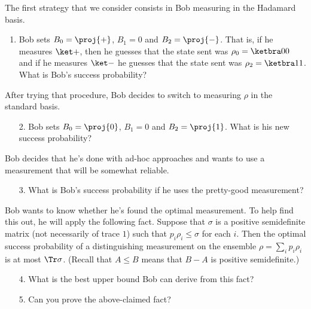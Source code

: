 \begin{exercises}
The first strategy that we consider consists in Bob measuring in the Hadamard basis. 
\begin{enumerate}
\item Bob sets $B_0 = \proj{+}$, $B_1=0$ and $B_2 = \proj{-}$. That is, if he measures $\ket +$, then he guesses that the state sent was $\rho_0 = \ketbra 00$ and if he measures $\ket -$ he guesses that the state sent was $\rho_2 = \ketbra 11$. What is Bob's success probability?
\end{enumerate}
After trying that procedure, Bob decides to switch to measuring $\rho$ in the standard basis.
\begin{enumerate}
\item[2.] Bob sets $B_0=\proj{0}$, $B_1=0$ and $B_2 = \proj{1}$. What is his new success probability?
\end{enumerate}
Bob decides that he's done with ad-hoc approaches and wants to use a measurement that will be somewhat reliable.
\begin{enumerate}
\item[3.] What is Bob's success probability if he uses the pretty-good measurement? 
\end{enumerate}
Bob wants to know whether he's found the optimal measurement. To help find this out, he will apply the following fact. Suppose that $\sigma$ is a positive semidefinite matrix (not necessarily of trace $1$) such that $p_i\rho_i \leq \sigma$ for each $i$. Then the optimal success probability of a distinguishing measurement on the ensemble $\rho = \sum_ip_i\rho_i$ is at most $\Tr\sigma$. (Recall that $A\leq B$ means that $B-A$ is positive semidefinite.)
\begin{enumerate}
\item[4.] What is the best upper bound Bob can derive from this fact?
\item[5.] Can you prove the above-claimed fact?
\end{enumerate}


\end{exercises}
